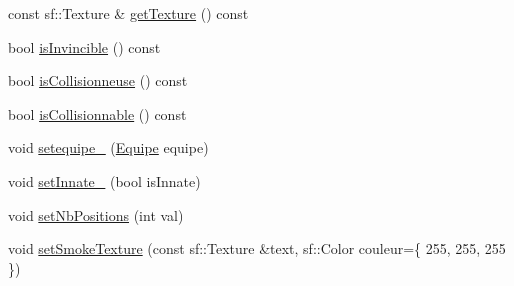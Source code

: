 \begin{DoxyCompactItemize}
const sf\+::\+Texture \& \hyperlink{class_entite_a49cdf7615d2afd6f4cbc781245da2c2c}{get\+Texture} () const
\item 
bool \hyperlink{class_entite_a3905c5bfe2890fd5da1f7ea704c277ac}{is\+Invincible} () const
\item 
bool \hyperlink{class_entite_af18791ba27e747f426db1125bf77aeff}{is\+Collisionneuse} () const
\item 
bool \hyperlink{class_entite_ac28aac949f2451d883aafaabb65a7b90}{is\+Collisionnable} () const
\item 
void \hyperlink{class_entite_ac5e59154ac3eb3f131d9ed7f2c84d7a8}{setequipe\+\_\+} (\hyperlink{constantes_8h_a08fa5554288d5031a8f3bb83cc04ee83}{Equipe} equipe)
\item 
void \hyperlink{class_entite_a74619d348057955b7272442222b63108}{set\+Innate\+\_\+} (bool is\+Innate)
\item 
void \hyperlink{class_entite_a5a44c467ca2c779f056767a7a4e00b42}{set\+Nb\+Positions} (int val)
\item 
void \hyperlink{class_entite_a8cf9eefe7401a127d7692ca379528050}{set\+Smoke\+Texture} (const sf\+::\+Texture \&text, sf\+::\+Color couleur=\{ 255, 255, 255 \})
\end{DoxyCompactItemize}
